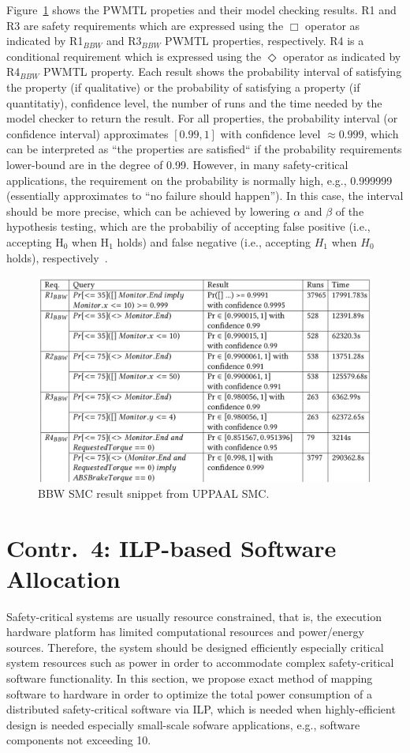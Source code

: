 Figure~\ref{fig_smcresult} shows the PWMTL propeties and their model checking results. R1 and R3 are safety requirements which are expressed using the $\Box$ operator as indicated by R1$_{BBW}$ and R3$_{BBW}$ PWMTL properties, respectively. R4 is a conditional requirement which is expressed using the $\Diamond$ operator as indicated by R4$_{BBW}$ PWMTL property. Each result shows the probability interval of satisfying the property (if qualitative) or the probability of satisfying a property (if quantitatiy), confidence level, the number of runs and the time needed by the model checker to return the result. For all properties, the probability interval (or confidence interval) approximates $[0.99,1]$ with confidence level $\approx0.999$, which can be interpreted as ``the properties are satisfied`` if the probability requirements lower-bound are in the degree of 0.99. However, in many safety-critical applications, the requirement on the probability is normally high, e.g., 0.999999 (essentially approximates to ``no failure should happen''). In this case, the interval should be more precise, which can be achieved by lowering $\alpha$ and $\beta$ of the hypothesis testing, which are the probabiliy of accepting false positive (i.e., accepting H$_0$ when H$_1$ holds) and false negative (i.e., accepting $H_1$ when $H_0$ holds), respectively~\cite{David2011StatisticalAutomata}.
\begin{figure}[h]
	\centering
	\includegraphics[width=0.8\linewidth]{images/smc_result}
	\caption{BBW SMC result snippet from UPPAAL SMC.}
	\label{fig_smcresult}
\end{figure}

\section{Contr.~4: ILP-based Software Allocation}\label{rc_ilp}
Safety-critical systems are usually resource constrained, that is, the execution hardware platform has limited computational resources and power/energy sources. Therefore, the system should be designed efficiently especially critical system resources such as power in order to accommodate complex safety-critical software functionality. In this section, we propose exact method of mapping software to hardware in order to optimize the total power consumption of a distributed safety-critical software via ILP, which is needed when highly-efficient design is needed especially small-scale sofware applications, e.g., software components not exceeding 10.

